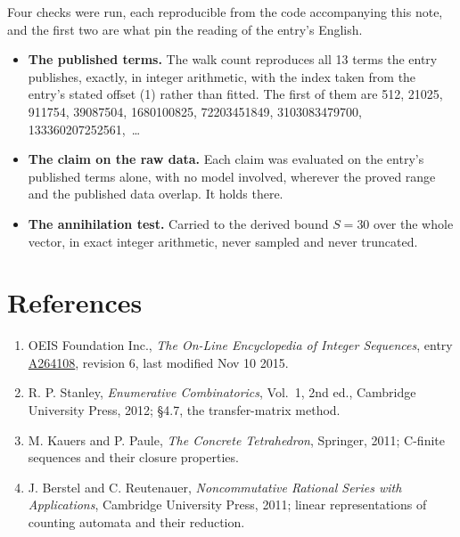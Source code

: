 \documentclass[11pt]{article}
\theoremstyle{definition}
\begin{document}
Four checks were run, each reproducible from the code accompanying this note, and the first two are what pin the reading of the entry's English.

\begin{itemize}

\item {\bfseries The published terms.} The walk count reproduces all 13 terms the entry publishes, exactly, in integer arithmetic, with the index taken from the entry's stated offset (1) rather than fitted. The first of them are 512, 21025, 911754, 39087504, 1680100825, 72203451849, 3103083479700, 133360207252561,~\dots

\item {\bfseries The claim on the raw data.} Each claim was evaluated on the entry's published terms alone, with no model involved, wherever the proved range and the published data overlap. It holds there.

\item {\bfseries The annihilation test.} Carried to the derived bound $S = 30$ over the whole vector, in exact integer arithmetic, never sampled and never truncated.

\end{itemize}

\section{References}

\begin{enumerate}

\item OEIS Foundation Inc., \emph{The On-Line Encyclopedia of Integer Sequences}, entry \href{https://oeis.org/A264108}{A264108}, revision 6, last modified Nov 10 2015.

\item R. P. Stanley, \emph{Enumerative Combinatorics}, Vol.~1, 2nd ed., Cambridge University Press, 2012; \S4.7, the transfer-matrix method.

\item M. Kauers and P. Paule, \emph{The Concrete Tetrahedron}, Springer, 2011; C-finite sequences and their closure properties.

\item J. Berstel and C. Reutenauer, \emph{Noncommutative Rational Series with Applications}, Cambridge University Press, 2011; linear representations of counting automata and their reduction.

\end{enumerate}
\end{document}
